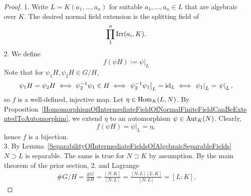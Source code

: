     \begin{proof}
        1. Write $L = K(a_1,\dots,a_n)$ for suitable $a_1,\dots,a_n\in L$ that are algebraic over $K$. The desired normal field extension is the splitting field of 
        $$
            \prod_1^n \mathrm{Irr}(a_i,K).
        $$ 
        2. We define 
        $$
            f(\psi H) := \left.\psi\right|_{L} 
        $$ 
        Note that for $\psi_1H,\psi_2H\in G/H$,
        $$
            \psi_1 H = \psi_2 H \iff \psi_2^{-1}\psi_1 \in H \iff \left.\psi_2^{-1}\psi_1\right|_{L} = \mathrm{id}_L \iff \left. \psi_1\right|_L = \left.\psi\right|_L,
        $$ 
        so $f$ is a well-defined, injective map. Let $\eta \in \mathrm{Hom}_K(L,N)$. By Proposition~\ref{HomomorphismOfIntermediateFieldOfNormalFiniteFieldCanBeExtentedToAutomorphim}, we extend $\eta$ to an automorphism $\psi\in \mathrm{Aut}_K(N)$. Clearly,
        $$
            f(\psi H) = \left.\psi\right|_{L} = \eta,
        $$
        hence $f$ is a bijection.\\
        3. By Lemma~\ref{SeparabilityOfIntermediateFieldsOfAlgebraicSeparableFields} $N\supset L$ is separable. The same is true for $N\supset K$ by assumption. By the main theorem of the prior section, 2. and Lagrange 
        \begin{align*}
            \# G/H = \frac{\#G}{\#H} = \frac{[N : K]}{[N : L]} = \frac{[N : L][L : K]}{[N : L]} = [L : K].
        \end{align*}
    \end{proof}
    
